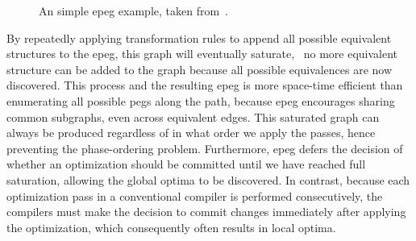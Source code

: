 \begin{figure}[ht]
    \caption{%
        An simple \acrshort{epeg} example, taken from~\cite{tate09}.
    }\label{bg:fig:epeg}
\end{figure}

By repeatedly applying transformation rules to append all possible equivalent
structures to the \gls{epeg}, this graph will eventually saturate, \ie~no
more equivalent structure can be added to the graph because all possible
equivalences are now discovered.  This process and the resulting \gls{epeg}
is more space-time efficient than enumerating all possible \glspl{peg} along
the path, because \gls{epeg} encourages sharing common subgraphs, even across
equivalent edges.  This saturated graph can always be produced regardless of in
what order we apply the passes, hence preventing the phase-ordering problem.
Furthermore, \gls{epeg} defers the decision of whether an optimization should
be committed until we have reached full saturation, allowing the global
optima to be discovered.  In contrast, because each optimization pass in a
conventional compiler is performed consecutively, the compilers must make the
decision to commit changes immediately after applying the optimization, which
consequently often results in local optima.
